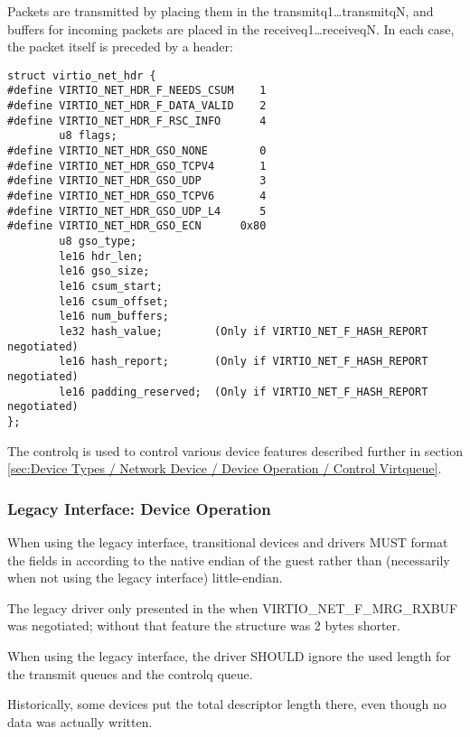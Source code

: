 Packets are transmitted by placing them in the
transmitq1\ldots transmitqN, and buffers for incoming packets are
placed in the receiveq1\ldots receiveqN. In each case, the packet
itself is preceded by a header:

\begin{lstlisting}
struct virtio_net_hdr {
#define VIRTIO_NET_HDR_F_NEEDS_CSUM    1
#define VIRTIO_NET_HDR_F_DATA_VALID    2
#define VIRTIO_NET_HDR_F_RSC_INFO      4
        u8 flags;
#define VIRTIO_NET_HDR_GSO_NONE        0
#define VIRTIO_NET_HDR_GSO_TCPV4       1
#define VIRTIO_NET_HDR_GSO_UDP         3
#define VIRTIO_NET_HDR_GSO_TCPV6       4
#define VIRTIO_NET_HDR_GSO_UDP_L4      5
#define VIRTIO_NET_HDR_GSO_ECN      0x80
        u8 gso_type;
        le16 hdr_len;
        le16 gso_size;
        le16 csum_start;
        le16 csum_offset;
        le16 num_buffers;
        le32 hash_value;        (Only if VIRTIO_NET_F_HASH_REPORT negotiated)
        le16 hash_report;       (Only if VIRTIO_NET_F_HASH_REPORT negotiated)
        le16 padding_reserved;  (Only if VIRTIO_NET_F_HASH_REPORT negotiated)
};
\end{lstlisting}

The controlq is used to control various device features described further in
section \ref{sec:Device Types / Network Device / Device Operation / Control Virtqueue}.

\subsubsection{Legacy Interface: Device Operation}\label{sec:Device Types / Network Device / Device Operation / Legacy Interface: Device Operation}
When using the legacy interface, transitional devices and drivers
MUST format the fields in 
according to the native endian of the guest rather than
(necessarily when not using the legacy interface) little-endian.

The legacy driver only presented  in the 
when VIRTIO_NET_F_MRG_RXBUF was negotiated; without that feature the
structure was 2 bytes shorter.

When using the legacy interface, the driver SHOULD ignore the
used length for the transmit queues
and the controlq queue.
\begin{note}
Historically, some devices put
the total descriptor length there, even though no data was
actually written.
\end{note}

